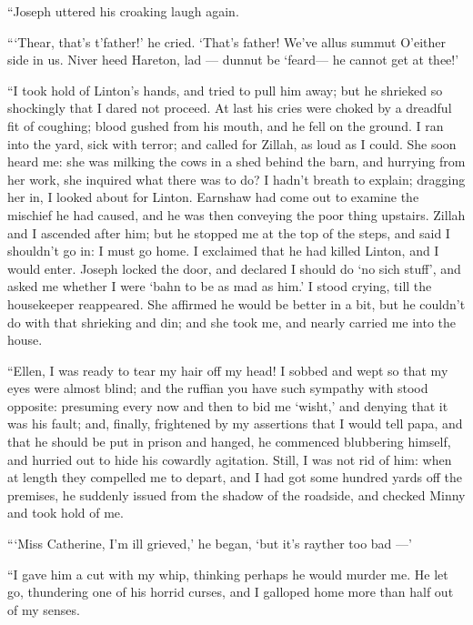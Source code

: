 \par “Joseph uttered his croaking laugh again.
\par “‘Thear, that's t'father!’ he cried. ‘That's father! We've allus summut O'either side in us. Niver heed Hareton, lad — dunnut be ‘feard— he cannot get at thee!’
\par “I took hold of Linton's hands, and tried to pull him away; but he shrieked so shockingly that I dared not proceed. At last his cries were choked by a dreadful fit of coughing; blood gushed from his mouth, and he fell on the ground. I ran into the yard, sick with terror; and called for Zillah, as loud as I could. She soon heard me: she was milking the cows in a shed behind the barn, and hurrying from her work, she inquired what there was to do? I hadn't breath to explain; dragging her in, I looked about for Linton. Earnshaw had come out to examine the mischief he had caused, and he was then conveying the poor thing upstairs. Zillah and I ascended after him; but he stopped me at the top of the steps, and said I shouldn't go in: I must go home. I exclaimed that he had killed Linton, and I would enter. Joseph locked the door, and declared I should do ‘no sich stuff', and asked me whether I were ‘bahn to be as mad as him.' I stood crying, till the housekeeper reappeared. She affirmed he would be better in a bit, but he couldn't do with that shrieking and din; and she took me, and nearly carried me into the house.
\par “Ellen, I was ready to tear my hair off my head! I sobbed and wept so that my eyes were almost blind; and the ruffian you have such sympathy with stood opposite: presuming every now and then to bid me ‘wisht,’ and denying that it was his fault; and, finally, frightened by my assertions that I would tell papa, and that he should be put in prison and hanged, he commenced blubbering himself, and hurried out to hide his cowardly agitation. Still, I was not rid of him: when at length they compelled me to depart, and I had got some hundred yards off the premises, he suddenly issued from the shadow of the roadside, and checked Minny and took hold of me.
\par “‘Miss Catherine, I'm ill grieved,’ he began, ‘but it's rayther too bad —’
\par “I gave him a cut with my whip, thinking perhaps he would murder me. He let go, thundering one of his horrid curses, and I galloped home more than half out of my senses.
